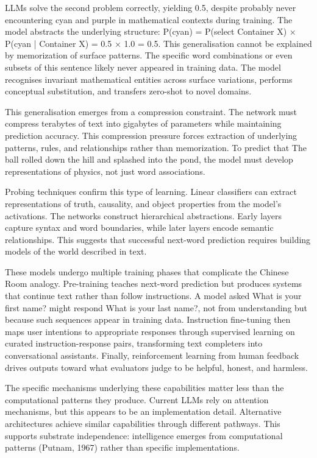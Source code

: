 LLMs solve the second problem correctly, yielding 0.5, despite probably never encountering \QSOpen{}cyan\QSClose{} and \QSOpen{}purple\QSClose{} in mathematical contexts during training. The model abstracts the underlying structure: P(cyan) = P(select Container X) × P(cyan | Container X) = 0.5 × 1.0 = 0.5. This generalisation cannot be explained by memorization of surface patterns. The specific word combinations or even subsets of this sentence likely never appeared in training data. The model recognises invariant mathematical entities across surface variations, performs conceptual substitution, and transfers zero-shot to novel domains.

This generalisation emerges from a compression constraint. The network must compress terabytes of text into gigabytes of parameters while maintaining prediction accuracy. This compression pressure forces extraction of underlying patterns, rules, and relationships rather than memorization. To predict that \QSOpen{}The ball rolled down the hill and splashed into the pond,\QSClose{} the model must develop representations of physics, not just word associations.

Probing techniques confirm this type of learning. Linear classifiers can extract representations of truth, causality, and object properties from the model's activations. The networks construct hierarchical abstractions. Early layers capture syntax and word boundaries, while later layers encode semantic relationships. This suggests that successful next-word prediction requires building models of the world described in text.

These models undergo multiple training phases that complicate the Chinese Room analogy. Pre-training teaches next-word prediction but produces systems that continue text rather than follow instructions. A model asked \QSOpen{}What is your first name?\QSClose{} might respond \QSOpen{}What is your last name?,\QSClose{} not from understanding but because such sequences appear in training data. Instruction fine-tuning then maps user intentions to appropriate responses through supervised learning on curated instruction-response pairs, transforming text completers into conversational assistants. Finally, reinforcement learning from human feedback drives outputs toward what evaluators judge to be helpful, honest, and harmless.

The specific mechanisms underlying these capabilities matter less than the computational patterns they produce. Current LLMs rely on attention mechanisms, but this appears to be an implementation detail. Alternative architectures achieve similar capabilities through different pathways. This supports substrate independence: intelligence emerges from computational patterns (Putnam, 1967) rather than specific implementations.

